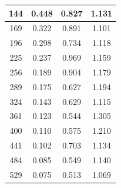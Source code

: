 \documentclass[letterpaper, 10 pt, conference]{ieeeconf}  %
\begin{document}
\begin{figure}
\begin{minipage}[b]{.45\linewidth}
\begin{center}
\begin{tabular}{|c|c|c|c|}
                        144               & 0.448                               & 0.827                                & 1.131                                 \\ \hline
                        169               & 0.322                               & 0.891                                & 1.101                                 \\ \hline
                        196               & 0.298                               & 0.734                                & 1.118                                 \\ \hline
                        225               & 0.237                               & 0.969                                & 1.159                                 \\ \hline
                        256               & 0.189                               & 0.904                                & 1.179                                 \\ \hline
                        289               & 0.175                               & 0.627                                & 1.194                                 \\ \hline
                        324               & 0.143                               & 0.629                                & 1.115                                 \\ \hline
                        361               & 0.123                               & 0.544                                & 1.305                                 \\ \hline
                        400               & 0.110                               & 0.575                                & 1.210                                 \\ \hline
                        441               & 0.102                               & 0.703                                & 1.134                                 \\ \hline
                        484               & 0.085                               & 0.549                                & 1.140                                 \\ \hline
                        529               & 0.075                               & 0.513                                & 1.069                                 \\ \hline
                        \end{tabular}
        \end{center}

\end{minipage}
\end{figure}
\end{document}
